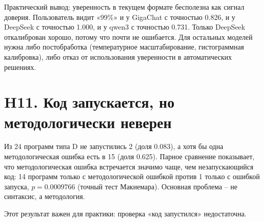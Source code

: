 \documentclass{bmstu}
\begin{document}
\begin{table}[htbp]
\centering
\caption{H10: калибровка уверенности (ECE)}
\label{tab:h10}
\vspace{-10pt}
\end{table}


Практический вывод: уверенность в текущем формате бесполезна как сигнал доверия. Пользователь видит «99\%» и у GigaChat с точностью 0.826, и у DeepSeek с точностью 1.000, и у qwen3 с точностью 0.731. Только DeepSeek откалиброван хорошо, потому что почти не ошибается. Для остальных моделей нужна либо постобработка (температурное масштабирование, гистограммная калибровка), либо отказ от использования уверенности в автоматических решениях.

\section{H11. Код запускается, но методологически неверен}
Из 24 программ типа D не запустились 2 (доля 0.083), а хотя бы одна методологическая ошибка есть в 15 (доля 0.625). Парное сравнение показывает, что методологическая ошибка встречается значимо чаще, чем незапускающийся код: 14 программ только с методологической ошибкой против 1 только с ошибкой запуска, $p=0.0009766$ (точный тест Макнемара). Основная проблема -- не синтаксис, а методология.


Этот результат важен для практики: проверка «код запустился» недостаточна. 
\end{document}
